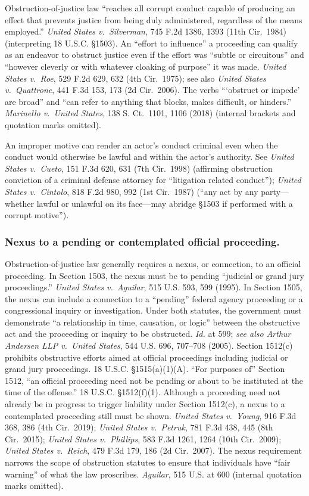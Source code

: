 Obstruction-of-justice law “reaches all corrupt conduct capable of producing an effect that prevents justice from being duly administered, regardless of the means employed.”
\textit{United States v.\ Silverman}, 745 F.2d 1386, 1393 (11th Cir.~1984) (interpreting 18 U.S.C. \S 1503).
An “effort to influence” a proceeding can qualify as an endeavor to obstruct justice even if the effort was “subtle or circuitous” and “however cleverly or with whatever cloaking of purpose” it was made.
\textit{United States v.\ Roe}, 529 F.2d 629, 632 (4th Cir.~1975);
see also \textit{United States v.\ Quattrone}, 441 F.3d 153, 173 (2d Cir.~2006).
The verbs “‘obstruct or impede’ are broad” and “can refer to anything that blocks, makes difficult, or hinders.”
\textit{Marinello v.\ United States}, 138 S. Ct.~1101, 1106 (2018) (internal brackets and quotation marks omitted).

An improper motive can render an actor’s conduct criminal even when the conduct would otherwise be lawful and within the actor’s authority.
See \textit{United States v.\ Cueto}, 151 F.3d 620, 631 (7th Cir.~1998) (affirming obstruction conviction of a criminal defense attorney for “litigation related conduct”); \textit{United States v.\ Cintolo}, 818 F.2d 980, 992 (1st Cir.~1987) (“any act by any party---whether lawful or unlawful on its face---may abridge \S 1503 if performed with a corrupt motive”).

\subsubsection*{Nexus to a pending or contemplated official proceeding.}

Obstruction-of-justice law generally requires a nexus, or connection, to an official proceeding.
In Section 1503, the nexus must be to pending “judicial or grand jury proceedings.”
\textit{United States v.\ Aguilar}, 515 U.S. 593, 599 (1995).
In Section 1505, the nexus can include a connection to a “pending” federal agency proceeding or a congressional inquiry or investigation.
Under both statutes, the government must demonstrate “a relationship in time, causation, or logic” between the obstructive act and the proceeding or inquiry to be obstructed.
\textit{Id.} at 599; \textit{see also Arthur Andersen LLP v.\ United States}, 544 U.S. 696, 707--708 (2005).
Section 1512(c) prohibits obstructive efforts aimed at official proceedings including judicial or grand jury proceedings.
18 U.S.C. \S 1515(a)(1)(A).
“For purposes of” Section 1512, “an official proceeding need not be pending or about to be instituted at the time of the offense.”
18 U.S.C. \S 1512(f)(1).
Although a proceeding need not already be in progress to trigger liability under Section 1512(c), a nexus to a contemplated proceeding still must be shown.
\textit{United States v.\ Young}, 916 F.3d 368, 386 (4th Cir.~2019);
\textit{United States v.\ Petruk}, 781 F.3d 438, 445 (8th Cir.~2015);
\textit{United States v.\ Phillips}, 583 F.3d 1261, 1264 (10th Cir.~2009);
\textit{United States v.\ Reich}, 479 F.3d 179, 186 (2d Cir.~2007).
The nexus requirement narrows the scope of obstruction statutes to ensure that individuals have “fair warning” of what the law proscribes.
\textit{Aguilar}, 515 U.S. at 600 (internal quotation marks omitted).

